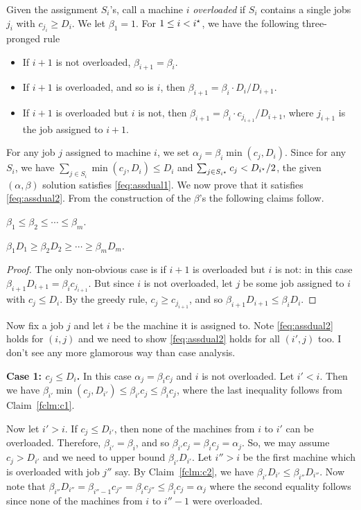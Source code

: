 Given the assignment $S_i$'s, call a machine $i$ {\em overloaded} if $S_i$ contains a single jobs $j_i$ with $c_{j_i} \geq D_i$.
We let $\beta_1 = 1$. For $1\leq i <i^\star$, we have the following three-pronged rule
\begin{itemize}[noitemsep]
	\item If $i+1$ is not overloaded, $\beta_{i+1} = \beta_i$.
	\item If $i+1$ is overloaded, and so is $i$, then $\beta_{i+1} = \beta_i \cdot D_i/D_{i+1}$.
	\item If $i+1$ is overloaded but $i$ is not, then $\beta_{i+1} = \beta_i \cdot c_{j_{i+1}}/D_{i+1}$, where $j_{i+1}$ is the job assigned to $i+1$.
\end{itemize}
For any job $j$ assigned to machine $i$, we set $\alpha_j = \beta_i \min(c_j,D_i)$. Since for any $S_i$, we have $\sum_{j\in S_i} \min(c_j,D_i) \leq D_i$ and $\sum_{j\in S_{i^\star}} c_j < D_{i^\star}/2$,  the given $(\alpha,\beta)$ solution satisfies \eqref{feq:assdual1}. We now prove that it satisfies \eqref{feq:assdual2}.
From the construction of the $\beta$'s the following claims follow.
\begin{claim}\label{fclm:c1}
$\beta_1\leq \beta_2 \leq \cdots \leq \beta_m$.
\end{claim}
\begin{claim}\label{fclm:c2}
$\beta_1D_1 \geq \beta_2D_2 \geq \cdots \geq \beta_mD_m$.
\end{claim}
\begin{proof}
	The only non-obvious case is if $i+1$ is overloaded but $i$ is not: in this case $\beta_{i+1}D_{i+1} = \beta_ic_{j_{i+1}}$. But since $i$ is not overloaded, let $j$ be some job assigned to $i$ with $c_j \leq D_i$.
	By the greedy rule, $c_j \geq c_{j_{i+1}}$, and so $\beta_{i+1}D_{i+1} \leq \beta_iD_i$.
\end{proof}
\noindent
Now fix a job $j$ and let $i$ be the machine it is assigned to. Note \eqref{feq:assdual2} holds for $(i,j)$ and we need to show \eqref{feq:assdual2} holds for all $(i',j)$ too.
I don't see any more glamorous way than case analysis. \smallskip

\noindent
{\bf Case 1: $c_j \leq D_i$.} In this case $\alpha_j = \beta_ic_j$ and $i$ is not overloaded.
Let $i' < i$.  Then we have $\beta_{i'}\min(c_j,D_{i'}) \le \beta_{i'}c_j \leq \beta_ic_j$, where the last inequality follows from Claim~\ref{fclm:c1}.

Now let $i' > i$. If $c_j \leq D_{i'}$, then none of the machines from $i$ to $i'$ can be overloaded. Therefore, $\beta_{i'} = \beta_i$, and so $\beta_{i'}c_j = \beta_ic_j = \alpha_j$.
So, we may assume $c_j > D_{i'}$ and we need to upper bound $\beta_{i'}D_{i'}$. Let $i'' > i$ be the first machine which is overloaded with job $j''$ say.
By Claim~\ref{fclm:c2}, we have $\beta_{i'}D_{i'} \leq \beta_{i''}D_{i''}$. Now note that
$\beta_{i''}D_{i''}  = \beta_{i''-1}c_{j''} = \beta_ic_{j''} \leq \beta_ic_j = \alpha_j$ where the second equality follows since none of the machines from $i$ to $i''-1$ were overloaded. \smallskip

